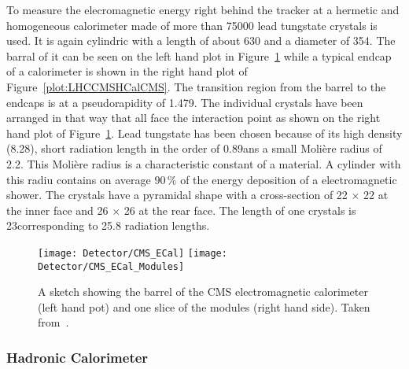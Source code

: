 To measure the elecromagnetic energy right behind the tracker at a hermetic and homogeneous calorimeter made of more than 75000 lead tungstate crystals is used. It is again cylindric with a length of about 630\cm{} and a diameter of 354\cm. The barral of it can be seen on the left hand plot in Figure~\ref{plot:LHCCMSECalCMS} while a typical endcap of a calorimeter is shown in the right hand plot of Figure~\ref{plot:LHCCMSHCalCMS}. The transition region from the barrel to the endcaps is at a pseudorapidity of 1.479. The individual crystals have been arranged in that way that all face the interaction point as shown on the right hand plot of Figure~\ref{plot:LHCCMSECalCMS}. Lead tungstate has been chosen because of its high density (8.28\gcmc{}), short radiation length in the order of 0.89\cm ans a small Moli\`ere radius of 2.2\cm{}. This Moli\`ere radius is a characteristic constant of a material. A cylinder with this radiu contains on average $90\,\%$ of the energy deposition of a electromagnetic shower. The crystals have a pyramidal shape with a cross-section of 22 $\times{}$ 22\mms{} at the inner face and 26 $\times{}$ 26\mms{} at the rear face. The length of one crystals is 23\cm corresponding to 25.8 radiation lengths.

\begin{figure}[!Hhtb]
  \centering
  \texttt{[image: Detector/CMS\_ECal]}
  \texttt{[image: Detector/CMS\_ECal\_Modules]}
  \caption[Sketches of the electromagnetic calorimeter of CMS]{A sketch showing the barrel of the CMS electromagnetic calorimeter (left hand pot) and one slice of the modules (right hand side). Taken from~. \label{plot:LHCCMSECalCMS}}
\end{figure}

\subsubsection{Hadronic Calorimeter}


